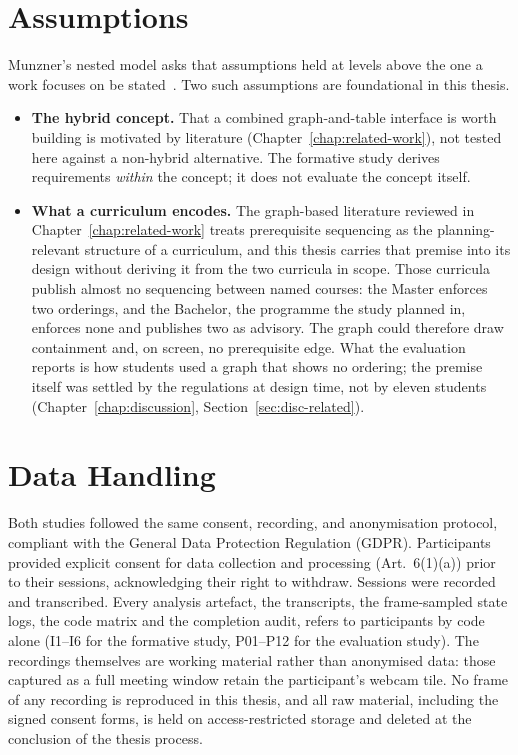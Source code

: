 \section{Assumptions}
\label{sec:overall-assumptions}

Munzner's nested model asks that assumptions held at levels above the one a work focuses on be stated~\cite{munzner2009}. Two such assumptions are foundational in this thesis.

\begin{itemize}
    \item \textbf{The hybrid concept.} That a combined graph-and-table interface is worth building is motivated by literature (Chapter~\ref{chap:related-work}), not tested here against a non-hybrid alternative. The formative study derives requirements \emph{within} the concept; it does not evaluate the concept itself.
    \item \textbf{What a curriculum encodes.} The graph-based literature reviewed in Chapter~\ref{chap:related-work} treats prerequisite sequencing as the planning-relevant structure of a curriculum, and this thesis carries that premise into its design without deriving it from the two curricula in scope. Those curricula publish almost no sequencing between named courses: the Master enforces two orderings, and the Bachelor, the programme the study planned in, enforces none and publishes two as advisory. The graph could therefore draw containment and, on screen, no prerequisite edge. What the evaluation reports is how students used a graph that shows no ordering; the premise itself was settled by the regulations at design time, not by eleven students (Chapter~\ref{chap:discussion}, Section~\ref{sec:disc-related}).
\end{itemize}

\section{Data Handling}
\label{sec:ethics-overview}

Both studies followed the same consent, recording, and anonymisation protocol, compliant with the General Data Protection Regulation (GDPR). Participants provided explicit consent for data collection and processing (Art.~6(1)(a)) prior to their sessions, acknowledging their right to withdraw. Sessions were recorded and transcribed. Every analysis artefact, the transcripts, the frame-sampled state logs, the code matrix and the completion audit, refers to participants by code alone (I1--I6 for the formative study, P01--P12 for the evaluation study). The recordings themselves are working material rather than anonymised data: those captured as a full meeting window retain the participant's webcam tile. No frame of any recording is reproduced in this thesis, and all raw material, including the signed consent forms, is held on access-restricted storage and deleted at the conclusion of the thesis process.

